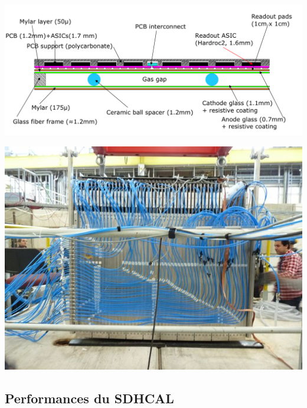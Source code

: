 \documentclass[8pt]{beamer}
\begin{document}
\begin{frame}
\begin{minipage}{0.58\linewidth}
      \begin{center}
        \includegraphics[width=0.9\linewidth]{GRPC-K7.png}      
      \end{center}
    \end{minipage} \hfill
    \begin{minipage}{0.4\linewidth}
      \begin{center}
        \includegraphics[width=0.7\linewidth]{sdhcal_testbeam.jpg}
      \end{center}
    \end{minipage}
  \end{frame}

  
  \subsection{Performances du SDHCAL}
  
\end{document}

